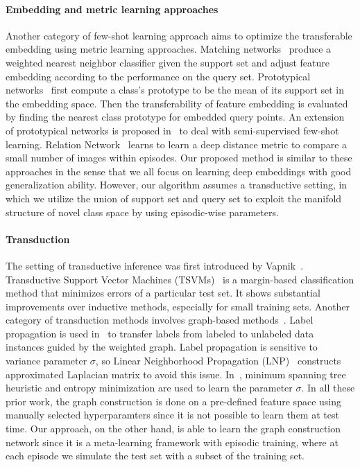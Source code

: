 \documentclass{article} \usepackage{iclr2019_conference,times}
\begin{document}
\paragraph{Embedding and metric learning approaches}
Another category of few-shot learning approach aims to optimize the transferable embedding using metric learning approaches. Matching networks~\citep{matching} produce a weighted nearest neighbor classifier given the support set and adjust feature embedding according to the performance on the query set. 
Prototypical networks~\citep{prototypical} first compute a class's prototype to be the mean of its support set in the embedding space. Then the transferability of feature embedding is evaluated by finding the nearest class prototype for embedded query points. An extension of prototypical networks is proposed in~\cite{semi-proto} to deal with semi-supervised few-shot learning.
Relation Network~\citep{compare} learns to learn a deep distance metric to compare a small number of images within episodes. Our proposed method is similar to these approaches in the sense that we all focus on learning deep embeddings with good generalization ability. However, our algorithm assumes a transductive setting, in which we utilize the union of support set and query set to exploit the manifold structure of novel class space by using episodic-wise parameters.

\paragraph{Transduction} 
The setting of transductive inference was first introduced by Vapnik~\citep{vapnik}. Transductive Support Vector Machines (TSVMs)~\citep{tsvm} is a margin-based classification method that minimizes errors of a particular test set. It shows substantial improvements over inductive methods, especially for small training sets. Another category of transduction methods involves graph-based methods~\citep{labelprop1,labelprop2,transfer,tzero}.  Label propagation is used in~\cite{labelprop1} to transfer labels from labeled to unlabeled data instances guided by the weighted graph. Label propagation is sensitive to variance parameter $\sigma$, so Linear Neighborhood Propagation (LNP)~\citep{labelprop2} constructs approximated Laplacian matrix to avoid this issue. In~\cite{labelprop3}, minimum spanning tree heuristic and entropy minimization are used to learn the parameter $\sigma$. In all these prior work, the graph construction is done on a pre-defined feature space using manually selected hyperparamters since it is not possible to learn them at test time. Our approach, on the other hand, is able to learn the graph construction network since it is a meta-learning framework with episodic training, where at each episode we simulate the test set with a subset of the training set.  
\end{document}
